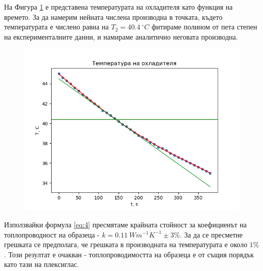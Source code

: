 \documentclass[reprint,amsmath,amssymb,aps,floatfix]{revtex4-2}
\newcommand{\degree}{^{\circ}}
\begin{document}
На Фигура \ref{fig:2} е представена температурата на охладителя като функция на времето. За да намерим нейната числена производна в точката, където температурата е числено равна на $T_2 = 40.4 \ \degree C$ фитираме полином от пета степен на експерименталните данни, и намираме аналитично неговата производна.  

\begin{figure}[H]
    \centering
    \includegraphics[width=\columnwidth, keepaspectratio=true]{graph_cool.png}
    \caption{} 
    \label{fig:2}
\end{figure}

Използвайки формула \eqref{eq:4} пресмятаме крайната стойност за коефициенът на топлопроводност на образеца - $k = 0.11 \ \si{Wm^{-1}K^{-1}} \pm 3\%$.  За да се пресметне грешката се предполага, че грешката в производната на температурата е около $1\%$. Този резултат е очакван - топлопроводимостта на образеца е от същия порядък като тази на плексиглас. 
\end{document}
